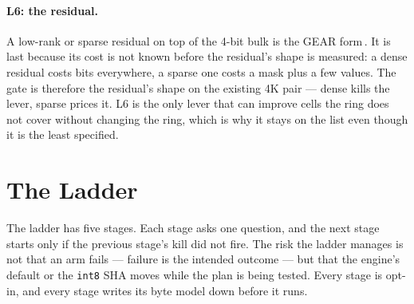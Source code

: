 \documentclass[10pt,twocolumn]{article}
\begin{document}
\paragraph{L6: the residual.} A low-rank or sparse residual on top of the 4-bit bulk is the GEAR form\,\cite{gear}. It is last because its cost is not known before the residual's shape is measured: a dense residual costs bits everywhere, a sparse one costs a mask plus a few values. The gate is therefore the residual's shape on the existing 4K pair --- dense kills the lever, sparse prices it. L6 is the only lever that can improve cells the ring does not cover without changing the ring, which is why it stays on the list even though it is the least specified.

\section{The Ladder}\label{sec:ladder}

The ladder has five stages. Each stage asks one question, and the next stage starts only if the previous stage's kill did not fire. The risk the ladder manages is not that an arm fails --- failure is the intended outcome --- but that the engine's default or the \texttt{int8} SHA moves while the plan is being tested. Every stage is opt-in, and every stage writes its byte model down before it runs.
\end{document}
